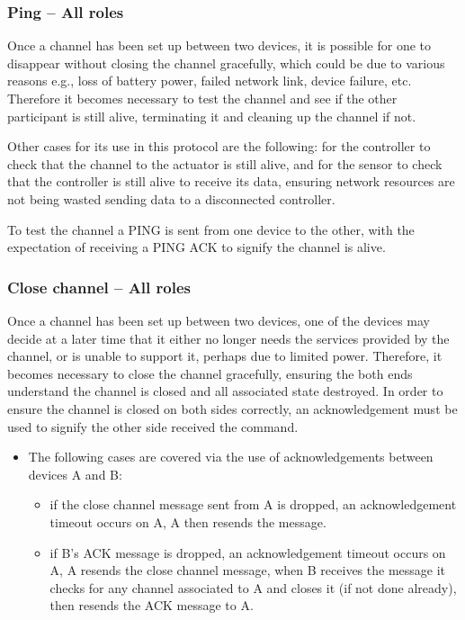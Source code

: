 \subsubsection{Ping -- All roles} %
\label{ssub:ping}
Once a channel has been set up between two devices, it is possible for one to disappear without closing the channel gracefully, which could be due to various reasons e.g., loss of battery power, failed network link, device failure, etc. Therefore it becomes necessary to test the channel and see if the other participant is still alive, terminating it and cleaning up the channel if not.

Other cases for its use in this protocol are the following: for the controller to check that the channel to the actuator is still alive, and for the sensor to check that the controller is still alive to receive its data, ensuring network resources are not being wasted sending data to a disconnected controller.

To test the channel a PING is sent from one device to the other, with the expectation of receiving a PING ACK to signify the channel is alive.

\subsubsection{Close channel -- All roles} %
\label{ssub:close_channel}
Once a channel has been set up between two devices, one of the devices may decide at a later time that it either no longer needs the services provided by the channel, or is unable to support it, perhaps due to limited power. Therefore, it becomes necessary to close the channel gracefully, ensuring the both ends understand the channel is closed and all associated state destroyed. In order to ensure the channel is closed on both sides correctly, an acknowledgement must be used to signify the other side received the command.

\begin{itemize}
	\item The following cases are covered via the use of acknowledgements between devices A and B:
	\begin{itemize}
		\item if the close channel message sent from A is dropped, an acknowledgement timeout occurs on A, A then resends the message.
		\item if B's ACK message is dropped, an acknowledgement timeout occurs on A, A resends the close channel message, when B receives the message it checks for any channel associated to A and closes it (if not done already), then resends the ACK message to A.
	\end{itemize}
\end{itemize}


